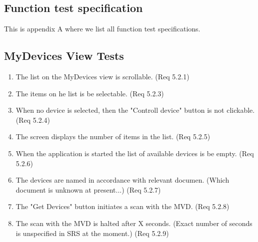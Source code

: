 \documentclass[a4paper]{article}
\newlength{\testlabellength}
\newenvironment{testlist}{\begin{enumerate}[label=\bfseries Test \thesubsection.\arabic* , labelindent=0pt, labelwidth=\testlabellength , leftmargin=2cm]}{\end{enumerate}}
\begin{document}
\newpage
\begin{appendices}

\section{Function test specification} \label{appendix:section:functiontest}
This is appendix A where we list all function test specifications.

\subsection{MyDevices View Tests}
\begin{testlist}
	\item The list on the MyDevices view is scrollable. (Req 5.2.1)
    \item The items on he list is be selectable. (Req 5.2.3)
    \item When no device is selected, then the "Controll device" button is not clickable. (Req 5.2.4)
    \item The screen displays the number of items in the list. (Req 5.2.5)
    \item When the application is started the list of available devices is be empty. (Req 5.2.6)
    \item The devices are named in accordance with relevant documen. (Which document is unknown at present...) (Req 5.2.7)
    \item The "Get Devices" button initiates a scan with the MVD. (Req 5.2.8)
    \item The scan with the MVD is halted after X seconds. (Exact number of seconds is unspecified in SRS at the moment.) (Req 5.2.9)
\end{testlist}


\end{appendices}
\end{document}
